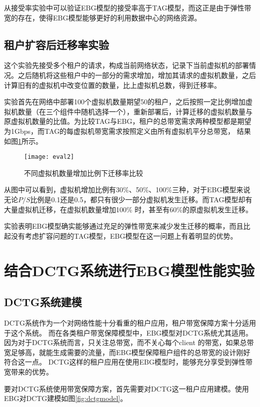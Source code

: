 从接受率实验中可以验证EBG模型的接受率高于TAG模型，而这正是由于弹性带宽的存在，使得EBG模型能够更好的利用数据中心的网络资源。

\subsection{租户扩容后迁移率实验}
这个实验先接受多个租户的请求，构成当前网络状态，记录下当前虚拟机的部署情况。之后随机将这些租户中的一部分的需求增加，增加其请求的虚拟机数量，之后计算旧有的虚拟机中改变位置的数量，比上虚拟机总数，得到迁移率。

实验首先在网络中部署100个虚拟机数量期望50的租户，之后按照一定比例增加虚拟机数量（在三个组件中随机选择一个），重新部署后，计算迁移的虚拟机数量与原虚拟机数量的比值。为比较TAG与EBG，租户的总带宽需求两种模型都是期望为1Gbps，而TAG的每虚拟机带宽需求按照定义由所有虚拟机平分总带宽，
结果如图\ref{fig:fig5.2}所示。

\begin{figure}[H]
  \centering
  \texttt{[image: eval2]}
  \caption{不同虚拟机数量增加比例下迁移率比较}
  \label{fig:fig5.2}
\end{figure}

从图中可以看到，虚拟机增加比例有30\%、50\%、100\%三种，对于EBG模型来说无论$P/S$比例是0.1还是0.5，都只有很少一部分虚拟机发生迁移。而TAG模型却有大量虚拟机迁移，在虚拟机数量增加100\% 时，甚至有60\%的原虚拟机发生迁移。

实验表明EBG模型确实能够通过充足的弹性带宽来减少发生迁移的概率，而且比起没有考虑扩容问题的TAG模型，EBG模型在这一问题上有着明显的优势。

\section{结合DCTG系统进行EBG模型性能实验}
\subsection{DCTG系统建模}
DCTG系统作为一个对网络性能十分看重的租户应用，租户带宽保障方案十分适用于这个系统。
而在各类租户带宽保障模型中，EBG模型对DCTG系统尤其适用。因为对于DCTG系统而言，只关注总带宽，而不关心每个client
的带宽，如果总带宽足够高，就能生成需要的流量，而EBG模型保障租户组件的总带宽的设计刚好符合这一点。
DCTG这样的租户应用在使用EBG模型时，能够充分享受到弹性带宽带来的优势。

要对DCTG系统使用带宽保障方案，首先需要对DCTG这一租户应用建模。使用EBG对DCTG建模如图\ref{fig:dctgmodel}。

